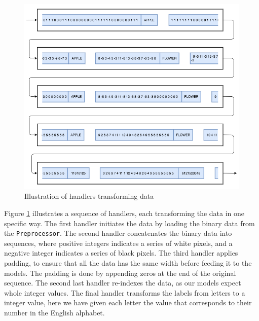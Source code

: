 \begin{figure}[H]
    \centering
    \includegraphics[width=1\textwidth]{fig/development_process/transformator.png}
    \caption{Illustration of handlers transforming data}
    \label{fig:development-transformator}
\end{figure}

Figure \ref{fig:development-transformator} illustrates a sequence of handlers, each transforming the data in one specific way. The first handler initiates the data by loading the binary data from the {\tt Preprocessor}. The second handler concatenates the binary data into sequences, where positive integers indicates a series of white pixels, and a negative integer indicates a series of black pixels. The third handler applies padding, to ensure that all the data has the same width before feeding it to the models. The padding is done by appending zeros at the end of the original sequence. The second last handler re-indexes the data, as our models expect whole integer values. The final handler transforms the labels from letters to a integer value, here we have given each letter the value that corresponds to their number in the English alphabet.